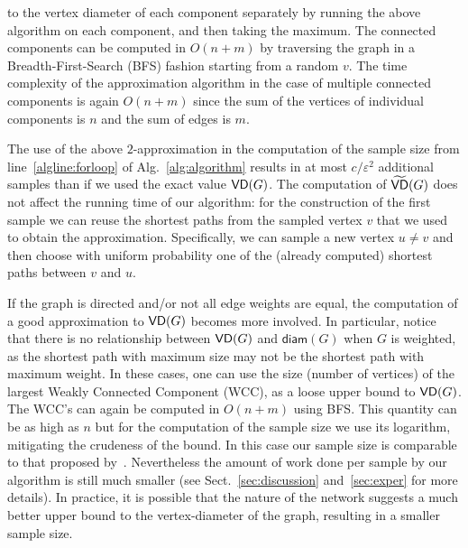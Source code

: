 to the vertex diameter of each component separately by running the above
algorithm on each component, and then taking the maximum. 
The connected components can be computed in $O(n+m)$ by traversing the graph in
a Breadth-First-Search (BFS) fashion starting from a random $v$.
The time complexity of the approximation algorithm in the case of multiple
connected components is again $O(n+m)$ since the sum of the vertices of
individual components is $n$ and the sum of edges is $m$. 

The use of the above $2$-approximation in the computation of the
sample size from line~\ref{algline:forloop} of Alg.~\ref{alg:algorithm} results
in at most $c/\varepsilon^2$ additional samples than if we
used the exact value $\mathsf{VD}(G)$. The computation of $\widetilde{\mathsf{VD}}(G)$
does not affect the running time of our algorithm: for the construction of
the first sample we can reuse the shortest paths from the sampled
vertex $v$ that we used to obtain the approximation. Specifically, we can sample
a new vertex $u\neq v$ and then choose with uniform probability one of the
(already computed) shortest paths between $v$ and $u$.

If the graph is directed and/or not all edge weights are equal, the computation
of a good approximation to $\mathsf{VD}(G)$ becomes more involved. In particular,
notice that there is no relationship between $\mathsf{VD}(G)$ and $\mathsf{diam}(G)$
when $G$ is weighted, as the shortest path with maximum size may not be the
shortest path with maximum weight. In these cases, one can use the size (number
of vertices) of the largest Weakly Connected Component (WCC), as a loose upper
bound to $\mathsf{VD}(G)$. The WCC's can again be computed in $O(n+m)$ using BFS.  This
quantity can be as high as $n$ but for the computation of the sample size we use
its logarithm, mitigating the crudeness of the bound. In this case our sample
size is comparable to that proposed by~\citet{BrandesP07}. %
Nevertheless the amount of work done per sample by our algorithm is still much
smaller (see Sect.~\ref{sec:discussion} and~\ref{sec:exper} for more
details). In practice, it is possible that the nature of the network suggests a
much better upper bound to the vertex-diameter of the graph, resulting in a
smaller sample size. %

